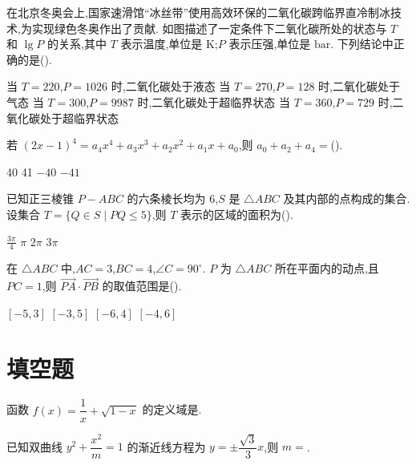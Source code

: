 \begin{problem}
在北京冬奥会上,国家速滑馆``冰丝带''使用高效环保的二氧化碳跨临界直冷制冰技术,为实现绿色冬奥作出了贡献. 如图描述了一定条件下二氧化碳所处的状态与 \(T\) 和 \(\lg P\) 的关系,其中 \(T\) 表示温度,单位是 \(\mathrm{K}\);\(P\) 表示压强,单位是 \(\mathrm{bar}\). 下列结论中正确的是(\quad).

\begin{center}
\end{center}

\choices
    {当 \(T=220\),\(P=1026\) 时,二氧化碳处于液态}
    {当 \(T=270\),\(P=128\) 时,二氧化碳处于气态}
    {当 \(T=300\),\(P=9987\) 时,二氧化碳处于超临界状态}
    {当 \(T=360\),\(P=729\) 时,二氧化碳处于超临界状态}
\end{problem}

\begin{problem}
若 \((2x-1)^4=a_4x^4+a_3x^3+a_2x^2+a_1x+a_0\),则 \(a_0+a_2+a_4=\)(\quad).

\choices
    {40}
    {41}
    {\(-40\)}
    {\(-41\)}
\end{problem}

\begin{problem}
已知正三棱锥 \(P-ABC\) 的六条棱长均为 6,\(S\) 是 \(\triangle ABC\) 及其内部的点构成的集合. 设集合 \(T=\{Q\in S\mid PQ\le 5\}\),则 \(T\) 表示的区域的面积为(\quad).

\choices
    {\(\frac{3\pi}{4}\)}
    {\(\pi\)}
    {\(2\pi\)}
    {\(3\pi\)}
\end{problem}

\begin{problem}
在 \(\triangle ABC\) 中,\(AC=3\),\(BC=4\),\(\angle C=90^\circ\). \(P\) 为 \(\triangle ABC\) 所在平面内的动点,且 \(PC=1\),则 \(\overrightarrow{PA}\cdot \overrightarrow{PB}\) 的取值范围是(\quad).

\choices
    {\([-5,3]\)}
    {\([-3,5]\)}
    {\([-6,4]\)}
    {\([-4,6]\)}
\end{problem}

\section{填空题}

\begin{problem}
函数 \(f(x)=\dfrac{1}{x}+\sqrt{1-x}\) 的定义域是\fillinblank{}.
\end{problem}

\begin{problem}
已知双曲线 \(y^2+\dfrac{x^2}{m}=1\) 的渐近线方程为 \(y=\pm \dfrac{\sqrt3}{3}x\),则 \(m=\)\fillinblank{}.
\end{problem}

